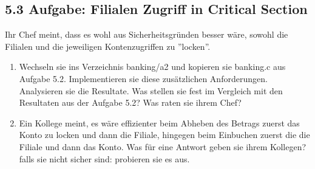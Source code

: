\documentclass[a4paper,10pt,english]{report}
\begin{document}
\subsection{5.3	Aufgabe: Filialen Zugriff in Critical Section}
\label{\detokenize{P08_Sync/README:aufgabe-filialen-zugriff-in-critical-section}}
\sphinxAtStartPar
Ihr Chef meint, dass es wohl aus Sicherheitsgründen besser wäre, sowohl die Filialen und die jeweiligen Kontenzugriffen zu ”locken”.
\begin{enumerate}
%
\item {} 
\sphinxAtStartPar
Wechseln sie ins Verzeichnis banking/a2 und kopieren sie banking.c aus Aufgabe 5.2. Implementieren sie diese zusätzlichen Anforderungen. Analysieren sie die Resultate. Was stellen sie fest im Vergleich mit den Resultaten aus der Aufgabe 5.2? Was raten sie ihrem Chef?

\item {} 
\sphinxAtStartPar
Ein Kollege meint, es wäre effizienter beim Abheben des Betrags zuerst das Konto zu locken und dann die Filiale, hingegen beim Einbuchen zuerst die die Filiale und dann das Konto. Was für eine Antwort geben sie ihrem Kollegen? falls sie nicht sicher sind: probieren sie es aus.

\end{enumerate}
\end{document}
